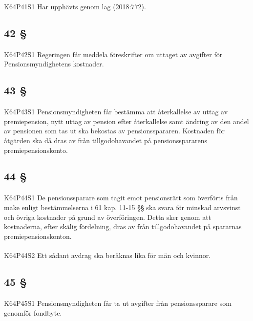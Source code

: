 \documentclass[a4paper,notitlepage,openany,10pt]{book}
\begin{document}
\paragraph*{}
{\tiny K64P41S1}
Har upphävts genom
lag (2018:772).
\subsection*{42 §}
\paragraph*{}
{\tiny K64P42S1}
Regeringen får meddela föreskrifter om uttaget av avgifter för Pensionsmyndighetens kostnader.
\subsection*{43 §}
\paragraph*{}
{\tiny K64P43S1}
Pensionsmyndigheten får bestämma att återkallelse av uttag av premiepension, nytt uttag av pension efter återkallelse samt ändring av den andel av pensionen som tas ut ska bekostas av pensionsspararen. Kostnaden för åtgärden ska då dras av från tillgodohavandet på pensionsspararens premiepensionskonto.
\subsection*{44 §}
\paragraph*{}
{\tiny K64P44S1}
De pensionssparare som tagit emot pensionsrätt som överförts från make enligt bestämmelserna i 61 kap. 11-15 §§ ska svara för minskad arvsvinst och övriga kostnader på grund av överföringen. Detta sker genom att kostnaderna, efter skälig fördelning, dras av från tillgodohavandet på spararnas premiepensionskonton.
\paragraph*{}
{\tiny K64P44S2}
Ett sådant avdrag ska beräknas lika för män och kvinnor.
\subsection*{45 §}
\paragraph*{}
{\tiny K64P45S1}
Pensionsmyndigheten får ta ut avgifter från pensionssparare som genomför fondbyte.
\end{document}

